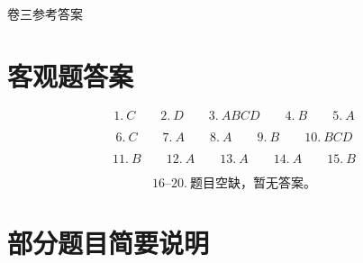 \documentclass[UTF8,a4paper,12pt]{ctexart}
\begin{document}

\newpage

\begin{center}
{\heiti{} 卷三参考答案}
\end{center}

\section*{客观题答案}

\[
1.\ C \qquad
2.\ D \qquad
3.\ ABCD \qquad
4.\ B \qquad
5.\ A
\]

\[
6.\ C \qquad
7.\ A \qquad
8.\ A \qquad
9.\ B \qquad
10.\ BCD
\]

\[
11.\ B \qquad
12.\ A \qquad
13.\ A \qquad
14.\ A \qquad
15.\ B
\]

\[
16\text{--}20.\ \text{题目空缺，暂无答案。}
\]

\section*{部分题目简要说明}
\end{document}
